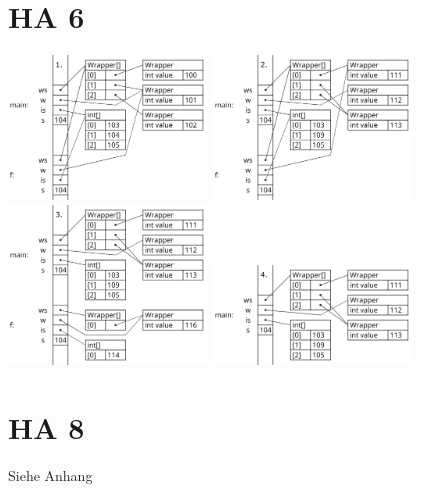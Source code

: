 \documentclass[a4paper]{article}
\begin{document}
\section*{ HA 6 }

	\includegraphics*[width=200px]{ProgramData_1.png} 
	\includegraphics*[width=200px]{ProgramData_2.png} 
	\includegraphics*[width=200px]{ProgramData_3.png} 
	\includegraphics*[width=200px]{ProgramData_4.png} 

\section*{ HA 8 }

Siehe Anhang
\end{document}
